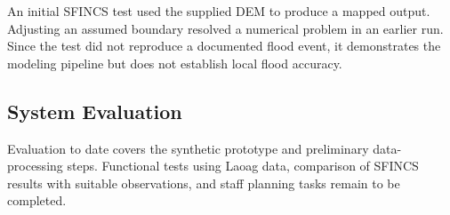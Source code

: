 An initial SFINCS test used the supplied DEM to produce a mapped output. Adjusting an assumed boundary resolved a numerical problem in an earlier run. Since the test did not reproduce a documented flood event, it demonstrates the modeling pipeline but does not establish local flood accuracy.

\subsection{System Evaluation}

Evaluation to date covers the synthetic prototype and preliminary data-processing steps. Functional tests using Laoag data, comparison of SFINCS results with suitable observations, and staff planning tasks remain to be completed.
